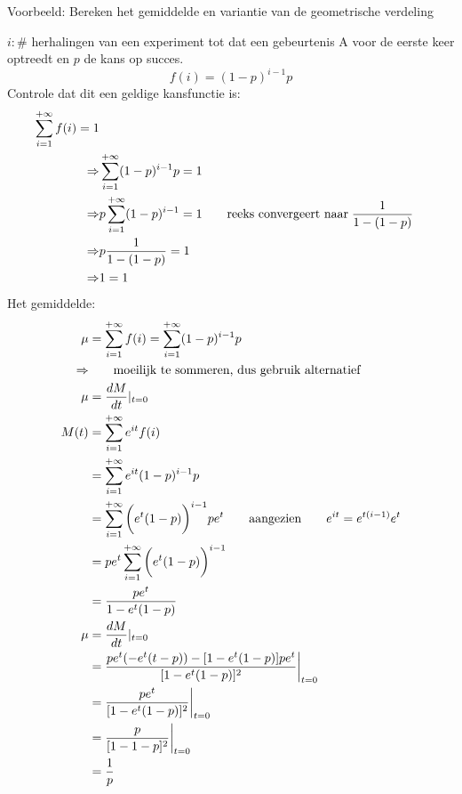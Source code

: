 \documentclass[12pt]{report}
\newcommand{\example}[2]{
      \hrulefill
      
      Voorbeeld: #1
      
      #2
      
      \hrulefill
  }
\begin{document}
\example{
        Bereken het gemiddelde en variantie van de geometrische verdeling
    }{
        $i: \#$ herhalingen van een experiment tot dat een gebeurtenis A voor de eerste keer optreedt en $p$ de kans op succes.
        $$f(i) = (1 - p)^{i - 1}p$$
        Controle dat dit een geldige kansfunctie is:
        \begin{equation*}
         \begin{split}
                        \sum_{i = 1}^{+\infty} f(i) = 1 \\
          \Rightarrow & \sum_{i = 1}^{+\infty} (1 - p)^{i - 1}p = 1 \\
          \Rightarrow & p\sum_{i = 1}^{+\infty} (1 - p)^{i - 1} = 1 \qquad \hbox{reeks convergeert naar}\; \frac{1}{1 - (1-p)}\\ 
          \Rightarrow & p\frac{1}{1 - (1-p)} = 1 \\
          \Rightarrow & 1 = 1
         \end{split}
        \end{equation*}
        Het gemiddelde:
        \begin{equation*}
         \begin{split}
          \mu & = \sum_{i=1}^{+\infty} f(i) = \sum_{i = 1}^{+\infty} (1 - p)^{i - 1}p \\
          \Rightarrow & \qquad \hbox{moeilijk te sommeren, dus gebruik alternatief} \\
          \mu & = \frac{dM}{dt}|_{t=0} \\
          M(t) & = \sum_{i = 1}^{+\infty}e^{it}f(i) \\
               & = \sum_{i = 1}^{+\infty}e^{it}(1 - p)^{i - 1}p \\
               & = \sum_{i = 1}^{+\infty} \bigg(e^{t}(1 - p)\bigg)^{i - 1}pe^{t} \qquad \hbox{aangezien} \qquad e^{it} = e^{t(i - 1)}e^{t} \\
               & = pe^{t}\sum_{i = 1}^{+\infty} \bigg(e^{t}(1 - p)\bigg)^{i - 1} \\
               & = \frac{pe^{t}}{1 - e^t(1 - p)} \\
          \mu & = \frac{dM}{dt}|_{t=0} \\
              & = \frac{pe^{t}(-e^t(t - p)) - [1 - e^t(1 - p)]pe^t}{[1 - e^t(1 - p)]^2}\bigg|_{t = 0} \\
              & = \frac{pe^{t}}{[1 - e^t(1 - p)]^2}\bigg|_{t = 0} \\
              & = \frac{p}{[1 - 1 - p]^2}\bigg|_{t = 0} \\
              & = \frac{1}{p}

\end{split}
\end{equation*}}
\end{document}
